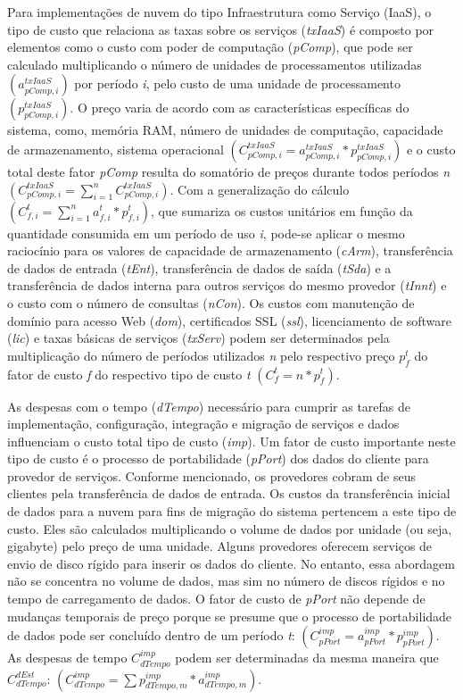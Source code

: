 \documentclass[tese,capa]{texufpel}
\begin{document}
Para implementações de nuvem do tipo Infraestrutura como Serviço (IaaS), o tipo de custo que relaciona as taxas sobre os serviços (\emph{txIaaS}) é composto por elementos como o custo com poder de computação (\emph{pComp}), que pode ser calculado multiplicando o número de unidades de processamentos utilizadas $\left(a^{txIaaS}_{pComp,i}\right)$ por período \emph{i}, pelo custo de uma unidade de processamento $\left(p^{txIaaS}_{pComp,i}\right)$. O preço varia de acordo com as características específicas do sistema, como, memória RAM, número de unidades de computação, capacidade de armazenamento, sistema operacional $\left(C^{txIaaS}_{pComp,i} = a^{txIaaS}_{pComp,i} * p^{txIaaS}_{pComp,i}\right)$ e o custo total deste fator \emph{pComp} resulta do somatório de preços durante todos períodos \emph{n} $\left(C^{txIaaS}_{pComp,i} = \sum\limits^{n}_{i=1} C^{txIaaS}_{pComp,i}\right)$. Com a generalização do cálculo $\left(C^{t}_{f,i} = \sum\limits^{n}_{i=1}a^{t}_{f,i} * p^{t}_{f,i}\right)$, que sumariza os custos unitários em função da quantidade consumida em um período de uso \emph{i}, pode-se aplicar o mesmo raciocínio para os valores de capacidade de armazenamento (\emph{cArm}), transferência de dados de entrada (\emph{tEnt}), transferência de dados de saída (\emph{tSda}) e a transferência de dados interna para outros serviços do mesmo provedor (\emph{tInnt}) e o custo com o número de consultas (\emph{nCon}). Os custos com manutenção de domínio para acesso Web (\emph{dom}), certificados SSL (\emph{ssl}), licenciamento de software (\emph{lic}) e taxas básicas de serviços (\emph{txServ}) podem ser determinados pela multiplicação do número de períodos utilizados \emph{n} pelo respectivo preço $p^{t}_{f}$ do fator de custo \emph{f} do respectivo tipo de custo \emph{t} $\left(C^{t}_{f} = n * p^{t}_{f}\right)$.

As despesas com o tempo (\emph{dTempo}) necessário para cumprir as tarefas de implementação, configuração, integração e migração de serviços e dados influenciam o custo total tipo de custo (\emph{imp}). Um fator de custo importante neste tipo de custo é o processo de portabilidade (\emph{pPort}) dos dados do cliente para provedor de serviços. Conforme mencionado, os provedores cobram de seus clientes pela transferência de dados de entrada. Os custos da transferência inicial de dados para a nuvem para fins de migração do sistema pertencem a este tipo de custo. Eles são calculados multiplicando o volume de dados por unidade (ou seja, gigabyte) pelo preço de uma unidade. Alguns provedores oferecem serviços de envio de disco rígido para inserir os dados do cliente. No entanto, essa abordagem não se concentra no volume de dados, mas sim no número de discos rígidos e no tempo de carregamento de dados. O fator de custo de \emph{pPort} não depende de mudanças temporais de preço porque se presume que o processo de portabilidade de dados pode ser concluído dentro de um período \emph{t}: $\left(C^{imp}_{pPort} = a^{imp}_{pPort} * p^{imp}_{pPort}\right)$. As despesas de tempo $C^{imp}_{dTempo}$ podem ser determinadas da mesma maneira que $C^{dEst}_{dTempo}$: $\left(C^{imp}_{dTempo} = \sum p^{imp}_{dTempo,m} * a^{imp}_{dTempo,m}\right)$.
\end{document}
